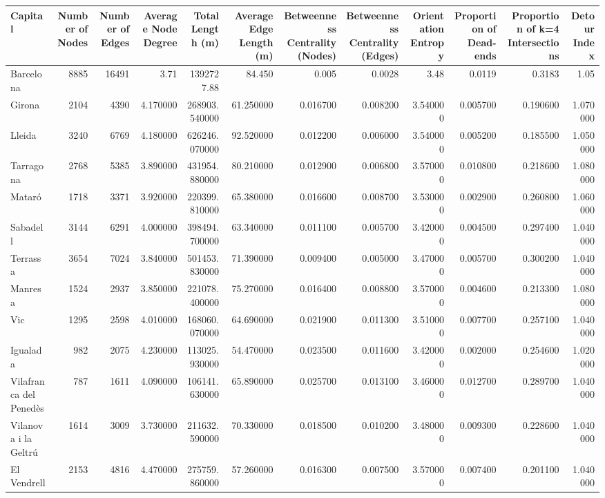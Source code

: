 \documentclass{article}
\begin{document}
\begin{table}[ht]
\centering
\begin{tabular}{lrrrrrrrrrrr}
\toprule
Capital & Number of Nodes & Number of Edges & Average Node Degree & Total Length (m) & Average Edge Length (m) & Betweenness Centrality (Nodes) & Betweenness Centrality (Edges) & Orientation Entropy & Proportion of Dead-ends & Proportion of k=4 Intersections & Detour Index \\
\midrule
Barcelona & 8885 & 16491 & 3.71 & 1392727.88 & 84.450 & 0.005 & 0.0028 & 3.48 & 0.0119 & 0.3183 & 1.05 \\
Girona & 2104 & 4390 & 4.170000 & 268903.540000 & 61.250000 & 0.016700 & 0.008200 & 3.540000 & 0.005700 & 0.190600 & 1.070000 \\
Lleida & 3240 & 6769 & 4.180000 & 626246.070000 & 92.520000 & 0.012200 & 0.006000 & 3.540000 & 0.005200 & 0.185500 & 1.050000 \\
Tarragona & 2768 & 5385 & 3.890000 & 431954.880000 & 80.210000 & 0.012900 & 0.006800 & 3.570000 & 0.010800 & 0.218600 & 1.080000 \\
Mataró & 1718 & 3371 & 3.920000 & 220399.810000 & 65.380000 & 0.016600 & 0.008700 & 3.530000 & 0.002900 & 0.260800 & 1.060000 \\
Sabadell & 3144 & 6291 & 4.000000 & 398494.700000 & 63.340000 & 0.011100 & 0.005700 & 3.420000 & 0.004500 & 0.297400 & 1.040000 \\
Terrassa & 3654 & 7024 & 3.840000 & 501453.830000 & 71.390000 & 0.009400 & 0.005000 & 3.470000 & 0.005700 & 0.300200 & 1.040000 \\
Manresa & 1524 & 2937 & 3.850000 & 221078.400000 & 75.270000 & 0.016400 & 0.008800 & 3.570000 & 0.004600 & 0.213300 & 1.080000 \\
Vic & 1295 & 2598 & 4.010000 & 168060.070000 & 64.690000 & 0.021900 & 0.011300 & 3.510000 & 0.007700 & 0.257100 & 1.040000 \\
Igualada & 982 & 2075 & 4.230000 & 113025.930000 & 54.470000 & 0.023500 & 0.011600 & 3.420000 & 0.002000 & 0.254600 & 1.020000 \\
Vilafranca del Penedès & 787 & 1611 & 4.090000 & 106141.630000 & 65.890000 & 0.025700 & 0.013100 & 3.460000 & 0.012700 & 0.289700 & 1.040000 \\
Vilanova i la Geltrú & 1614 & 3009 & 3.730000 & 211632.590000 & 70.330000 & 0.018500 & 0.010200 & 3.480000 & 0.009300 & 0.228600 & 1.040000 \\
El Vendrell & 2153 & 4816 & 4.470000 & 275759.860000 & 57.260000 & 0.016300 & 0.007500 & 3.570000 & 0.007400 & 0.201100 & 1.040000 \\

\end{tabular}
\end{table}
\end{document}
